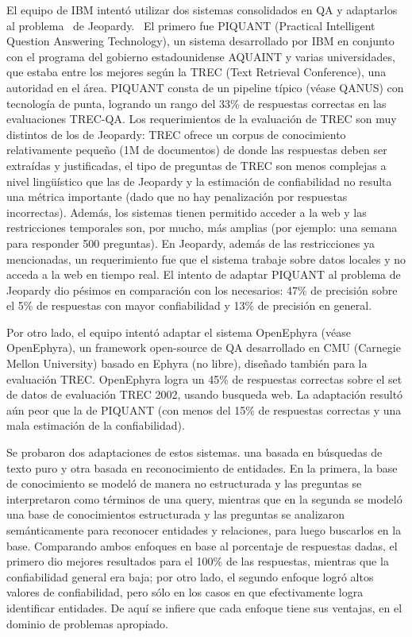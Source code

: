 El equipo de IBM intent\'o utilizar dos sistemas consolidados en QA y
adaptarlos al problema \ de Jeopardy. \ El primero fue PIQUANT
(Practical Intelligent Question Answering Technology), un sistema
desarrollado por IBM en conjunto con el programa del gobierno
estadounidense AQUAINT y varias universidades, que estaba entre los
mejores seg\'un la TREC (Text Retrieval Conference), una autoridad en
el \'area. PIQUANT consta de un pipeline t\'ipico (v\'ease QANUS) con
tecnolog\'ia de punta, logrando un rango del 33\% de respuestas
correctas en las evaluaciones TREC-QA. Los requerimientos de la
evaluaci\'on de TREC son muy distintos de los de Jeopardy: TREC ofrece
un corpus de conocimiento relativamente peque\~no (1M de documentos) de
donde las respuestas deben ser extra\'idas y justificadas, el tipo de
preguntas de TREC son menos complejas a nivel ling\"u\'istico que las
de Jeopardy y la estimaci\'on de confiabilidad no resulta una m\'etrica
importante (dado que no hay penalizaci\'on por respuestas incorrectas).
Adem\'as, los sistemas tienen permitido acceder a la web y las
restricciones temporales son, por mucho, m\'as amplias (por ejemplo:
una semana para responder 500 preguntas). En Jeopardy, adem\'as de las
restricciones ya mencionadas, un requerimiento fue que el sistema
trabaje sobre datos locales y no acceda a la web en tiempo real. El
intento de adaptar PIQUANT al problema de Jeopardy dio p\'esimos en
comparaci\'on con los necesarios: 47\% de precisi\'on sobre el 5\% de
respuestas con mayor confiabilidad y 13\% de precisi\'on en general. 

Por otro lado, el equipo intent\'o adaptar el sistema OpenEphyra
(v\'ease OpenEphyra), un framework open-source de QA desarrollado en
CMU (Carnegie Mellon University) basado en Ephyra (no libre),
dise\~nado tambi\'en para la evaluaci\'on TREC. OpenEphyra logra un
45\% de respuestas correctas sobre el set de datos de evaluaci\'on TREC
2002, usando busqueda web. La adaptaci\'on result\'o a\'un peor que la
de PIQUANT (con menos del 15\% de respuestas correctas y una mala
estimaci\'on de la confiabilidad). 

Se probaron dos adaptaciones de estos sistemas. una basada en
b\'usquedas de texto puro y otra basada en reconocimiento de entidades.
En la primera, la base de conocimiento se model\'o de manera no
estructurada y las preguntas se interpretaron como t\'erminos de una
query, mientras que en la segunda se model\'o una base de conocimientos
estructurada y las preguntas se analizaron sem\'anticamente para
reconocer entidades y relaciones, para luego buscarlos en la base.
Comparando ambos enfoques en base al porcentaje de respuestas dadas, el
primero dio mejores resultados para el 100\% de las respuestas,
mientras que la confiabilidad general era baja; por otro lado, el
segundo enfoque logr\'o altos valores de confiabilidad, pero s\'olo en
los casos en que efectivamente logra identificar entidades. De aqu\'i
se infiere que cada enfoque tiene sus ventajas, en el dominio de
problemas apropiado.

